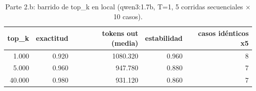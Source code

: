 \begin{table}[H]\centering\caption{Parte 2.b: barrido de top\_k en local (qwen3:1.7b, T=1, 5 corridas secuenciales $\times$ 10 casos).}\label{tab:p2bk}
{\footnotesize\setlength{\tabcolsep}{3.5pt}
\begin{tabular}{rrrrr}
\hline
top\_k & exactitud & tokens out (media) & estabilidad & casos idénticos x5 \\
\hline
1.000 & 0.920 & 1080.320 & 0.960 & 8 \\
5.000 & 0.960 & 947.780 & 0.880 & 7 \\
40.000 & 0.980 & 931.120 & 0.860 & 7 \\
\hline
\end{tabular}
}\end{table}
